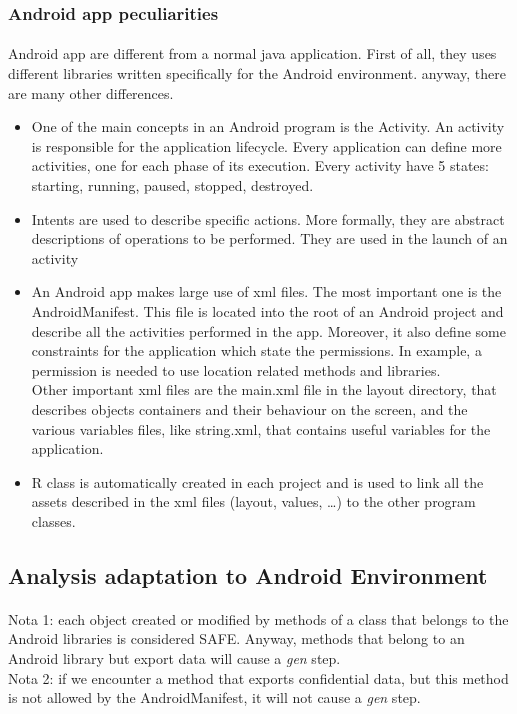 \documentclass[letterpaper,twocolumn,10pt]{article}
\begin{document}
\subsubsection{Android app peculiarities~\cite{Burnette:2010:HAI:1893143}}
\paragraph{}
Android app are different from a normal java application. First of all, they uses different libraries written specifically for the Android environment. anyway, there are many other differences.
\begin{itemize}
\item One of the main concepts in an Android program is the Activity. An activity is responsible for the application lifecycle. Every application can define more activities, one for each phase of its execution. Every activity have 5 states: starting, running, paused, stopped, destroyed. 
\item Intents are used to describe specific actions. More formally, they are abstract descriptions of operations to be performed. They are used in the launch of an activity~\cite{website:androiddev}
\item An Android app makes large use of xml files. The most important one is the AndroidManifest. This file is located into the root of an Android project and describe all the activities performed in the app. Moreover, it also define some constraints for the application which state the permissions. In example, a permission is needed to use location related methods and libraries.\\ Other important xml files are the main.xml file in the layout directory, that describes objects containers and their behaviour on the screen, and the various variables files, like string.xml, that contains useful variables for the application.
\item R class is automatically created in each project and is used to link all the assets described in the xml files (layout, values, \ldots) to the other program classes.
\end{itemize} 

\subsection{Analysis adaptation to Android Environment}
\paragraph{}
Nota 1: each object created or modified by methods of a class that belongs to the Android libraries is considered SAFE. Anyway, methods that belong to an Android library but export data will cause a \emph{gen} step.\\
Nota 2: if we encounter a method that exports confidential data, but this method is not allowed by the AndroidManifest, it will not cause a \emph{gen} step.
\end{document}
